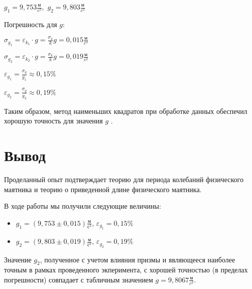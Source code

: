 \documentclass[a5paper, 11pt]{article}
\begin{document}
$g_{1} = 9,753 \frac{\text{м}}{c^2},$ 
$g_{2} = 9,803 \frac{\text{м}}{c^2}$

Погрешность для $g$:

$\sigma_{g_1} = \varepsilon_{k_1} \cdot g = \frac{\sigma_k}{k}g = 0,015 \frac{\text{м}}{c^2}$

$\sigma_{g_2} = \varepsilon_{k_2} \cdot g = \frac{\sigma_k}{k}g = 0,019 \frac{\text{м}}{c^2}$

$\varepsilon_{g_1} = \frac{\sigma_g}{g_1} \approx 0,15\%$

$\varepsilon_{g_2} = \frac{\sigma_g}{g_2} \approx 0,19\%$

Таким образом, метод наименьших квадратов при обработке данных обеспечил хорошую точность для значения $g$ .


\section{Вывод}
Проделанный опыт подтверждает теорию для периода колебаний физического маятника и теорию о приведенной длине физического маятника. 

В ходе работы мы получили следующие величины:
\begin{itemize}
	\item $ g_1 = \left( 9,753\pm 0,015\right) \frac{\text{м}}{\text{с}^2} $, $ \varepsilon_{g_1} = 0,15\% $
	
	\item $ g_2 = \left( 9,803\pm 0,019\right) \frac{\text{м}}{\text{с}^2} $, $ \varepsilon_{g_2} = 0,19\% $
\end{itemize}

Значение $g_2$, полученное с учетом влияния призмы и являющееся наиболее точным в рамках проведенного экперимента, с хорошей точностью (в пределах погрешности) совпадает с табличным значением $g = 9,8067 \frac{\text{м}}{c^2}$.
\end{document}
